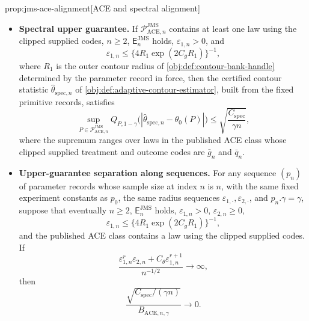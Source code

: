 \begin{propositionv}{prop:jms-ace-alignment}[ACE and spectral alignment]
\begin{itemize}
\item \textbf{Spectral upper guarantee.} If
\(\mathcal P_{\mathrm{ACE},n}^{\mathrm{JMS}}\) contains at least one law using
the clipped supplied codes, \(n\ge2\), \(\mathsf E_n^{\mathrm{JMS}}\) holds,
\(\varepsilon_{1,n}>0\), and
\[
 \varepsilon_{1,n}
 \le
 \{4R_1\exp(2C_gR_1)\}^{-1},
\]
where \(R_1\) is the outer contour radius of \cref{obj:def:contour-bank-handle} determined by the parameter record in force,
then the certified contour statistic
\(\widehat\theta_{\mathrm{spec},n}\) of
\cref{obj:def:adaptive-contour-estimator}, built from the fixed primitive
records, satisfies
\[
 \sup_{P\in\mathcal P_{\mathrm{ACE},n}^{\mathrm{JMS}}}
 Q_{P,1-\gamma}
 \bigl(|\widehat\theta_{\mathrm{spec},n}-\theta_0(P)|\bigr)
 \le
 \sqrt{\frac{C_{\mathrm{spec}}}{\gamma n}},
\]
where the supremum ranges over laws in the published ACE class whose clipped
supplied treatment and outcome codes are \(\bar g_n\) and \(\bar q_n\).

\item \textbf{Upper-guarantee separation along sequences.} For any sequence
\((p_n)\) of parameter records whose sample size at index \(n\) is \(n\), with the
same fixed experiment constants as \(p_0\),
the same radius sequences \(\varepsilon_{1,\cdot},\varepsilon_{2,\cdot}\),
and \(p_n.\gamma=\gamma\), suppose that eventually
\(n\ge2\), \(\mathsf E_n^{\mathrm{JMS}}\) holds,
\(\varepsilon_{1,n}>0\), \(\varepsilon_{2,n}\ge0\),
\[
 \varepsilon_{1,n}
 \le
 \{4R_1\exp(2C_gR_1)\}^{-1},
\]
and the published ACE class contains a law using the clipped supplied codes.
If
\[
 \frac{
   \varepsilon_{1,n}^r\varepsilon_{2,n}
   + C_{\theta}\varepsilon_{1,n}^{r+1}
 }{n^{-1/2}}
 \longrightarrow \infty,
\]
then
\[
 \frac{
   \sqrt{C_{\mathrm{spec}}/(\gamma n)}
 }{
   B_{\mathrm{ACE},n,\gamma}
 }
 \longrightarrow 0 .
\]
\end{itemize}
\end{propositionv}

